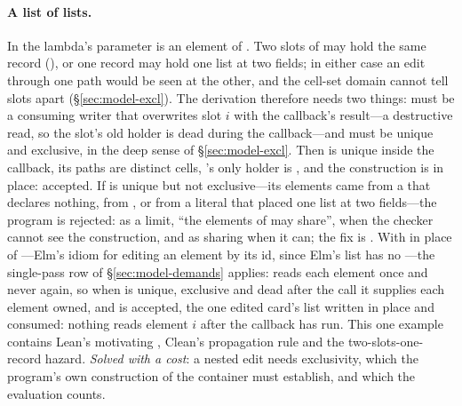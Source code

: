 \paragraph{A list of lists.} In  the
lambda's parameter  is an element of . Two slots of  may hold the same
record (\code{[ r, r ]}), or one record may hold one list at two fields; in either case an edit through
one path would be seen at the other, and the cell-set domain cannot tell slots apart
(\S\ref{sec:model-excl}). The derivation therefore needs two things:  must be a
consuming writer that overwrites slot $i$ with the callback's result---a destructive read, so the slot's
old holder is dead during the callback---and  must be unique and exclusive, in the deep sense
of \S\ref{sec:model-excl}. Then  is unique inside the callback, its paths are distinct cells,
's only holder is , and the construction is in place: accepted. If  is
unique but not exclusive---its elements came from a  that declares nothing, from
, or from a literal that placed one list at two fields---the program is rejected: as a
limit, ``the elements of  may share'', when the checker cannot see the construction, and as
sharing when it can; the fix is . With  in place of ---Elm's
idiom for editing an element by its id, since Elm's list has no ---the single-pass row of
\S\ref{sec:model-demands} applies:  reads each element once and never again, so when 
is unique, exclusive and dead after the call it supplies each element owned, and
 is accepted, the
one edited card's list written in place and  consumed: nothing reads element $i$ after the
callback has run. This one example contains Lean's
motivating , Clean's propagation rule and the two-slots-one-record hazard. \emph{Solved
with a cost}: a nested edit needs exclusivity, which the program's own construction of the container
must establish, and which the evaluation counts.

